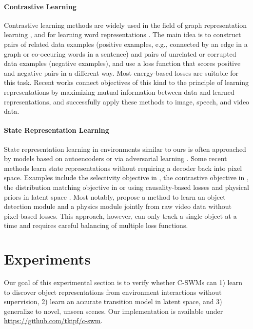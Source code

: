 \documentclass{article} %
\begin{document}
\paragraph{Contrastive Learning}
Contrastive learning methods are widely used in the field of graph representation learning \citep{bordes2013translating,perozzi2014deepwalk,grover2016node2vec,bordes2013translating,schlichtkrull2018modeling,velivckovic2018deep}, and for learning word representations \citep{mnih2012fast,mikolov2013efficient}. The main idea is to construct pairs of related data examples (positive examples, e.g., connected by an edge in a graph or co-occuring words in a sentence) and pairs of unrelated or corrupted data examples (negative examples), and use a loss function that scores positive and negative pairs in a different way. Most energy-based losses \citep{lecun2006tutorial} are suitable for this task. Recent works \citep{oord2018representation,hjelm2018learning,henaff2019data,sun2019contrastive,anand2019unsupervised} connect objectives of this kind to the principle of learning representations by maximizing mutual information between data and learned representations, and successfully apply these methods to image, speech, and video data.

\paragraph{State Representation Learning} State representation learning in environments similar to ours is often approached by models based on autoencoders \citep{corneil2018efficient, watter2015embed, ha2018world, hafner2018learning, laversanne2018curiosity} or via adversarial learning \citep{kurutach2018learning, wang2019learning}. Some recent methods learn state representations without requiring a decoder back into pixel space. Examples include the selectivity objective in \citet{thomas2018disentangling}, the contrastive objective in \citet{franccois2018combined}, the distribution matching objective in \citet{gelada2019deepmdp} or using causality-based losses and physical priors in latent space \citep{jonschkowski2015learning,ehrhardt2018unsupervised}. Most notably, \citet{ehrhardt2018unsupervised} propose a method to learn an object detection module and a physics module jointly from raw video data without pixel-based losses. This approach, however, can only track a single object at a time and requires careful balancing of multiple loss functions.

\section{Experiments}
Our goal of this experimental section is to verify whether C-SWMs can 1) learn to discover object representations from environment interactions without supervision, 2) learn an accurate transition model in latent space, and 3) generalize to novel, unseen scenes. Our implementation is available under \url{https://github.com/tkipf/c-swm}.
\end{document}
